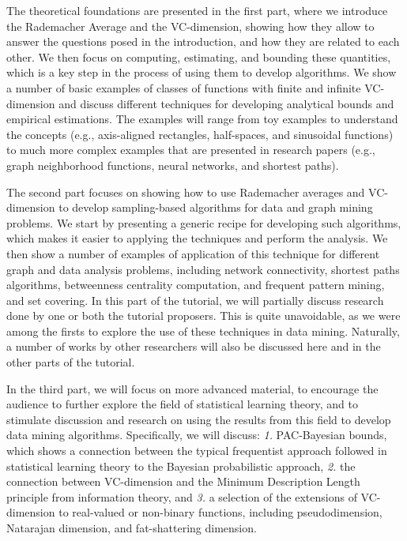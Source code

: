 \documentclass{sig-alternate-2013}
\begin{document}
\medskip
The theoretical foundations are presented in the first part, where we introduce
the Rademacher Average and the VC-dimension, showing how they allow to answer
the questions posed in the introduction, and how they are related to each other.
We then focus on computing, estimating, and bounding these quantities, which is
a key step in the process of using them to develop algorithms. We show a number
of basic examples of classes of functions with finite and infinite VC-dimension
and discuss different techniques for developing analytical bounds and empirical
estimations. The examples will range from toy examples to understand the
concepts (e.g., axis-aligned rectangles, half-spaces, and sinusoidal functions)
to much more complex examples that are presented in research papers (e.g.,
graph neighborhood functions, neural networks, and shortest paths).

\medskip
The second part focuses on showing how to use Rademacher averages and
VC-dimension to develop sampling-based algorithms for data and graph mining
problems. We start by presenting a generic recipe for developing such
algorithms, which makes it easier to applying the techniques and perform the
analysis. We then show a number of examples of application of this technique for
different graph and data analysis problems, including network connectivity,
shortest paths algorithms, betweenness centrality computation, and frequent
pattern mining, and set covering. In this part of the tutorial, we will
partially discuss research done by one or both the tutorial proposers. This is
quite unavoidable, as we were among the firsts to explore the use of these
techniques in data mining.  Naturally, a number of works by other researchers
will also be discussed here and in the other parts of the tutorial.

\medskip
In the third part, we will focus on more advanced material, to encourage the
audience to further explore the field of statistical learning theory, and to
stimulate discussion and research on using the results from this field to
develop data mining algorithms. Specifically, we will discuss: {\em 1.}
PAC-Bayesian bounds, which shows a connection between the typical frequentist
approach followed in statistical learning theory to the Bayesian probabilistic
approach, {\em 2.} the connection between VC-dimension and the Minimum
Description Length principle from information theory, and {\em 3.} a selection
of the extensions of VC-dimension to real-valued or non-binary functions,
including pseudodimension, Natarajan dimension, and fat-shattering dimension.
\end{document}

